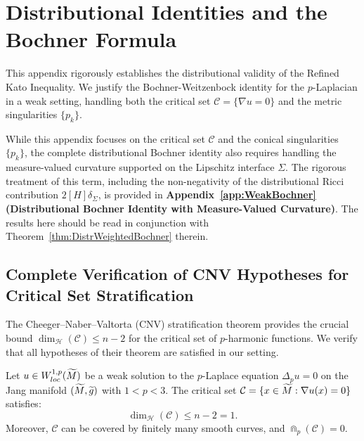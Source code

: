 \section{Distributional Identities and the Bochner Formula}
\label{app:Bochner}

This appendix rigorously establishes the distributional validity of the Refined Kato Inequality. We justify the Bochner-Weitzenbock identity for the $p$-Laplacian in a weak setting, handling both the critical set $\mathcal{C} = \{ \nabla u = 0 \}$ and the metric singularities $\{p_k\}$.

\begin{remark}
While this appendix focuses on the critical set $\mathcal{C}$ and the conical singularities $\{p_k\}$, the complete distributional Bochner identity also requires handling the measure-valued curvature supported on the Lipschitz interface $\Sigma$. The rigorous treatment of this term, including the non-negativity of the distributional Ricci contribution $2[H]\delta_\Sigma$, is provided in \textbf{Appendix~\ref{app:WeakBochner} (Distributional Bochner Identity with Measure-Valued Curvature)}. The results here should be read in conjunction with Theorem~\ref{thm:DistrWeightedBochner} therein.
\end{remark}

\subsection{Complete Verification of CNV Hypotheses for Critical Set Stratification}

The Cheeger--Naber--Valtorta (CNV) stratification theorem \cite{cheegernabervaltorta2015} provides the crucial bound $\dim_{\mathcal{H}}(\mathcal{C}) \le n-2$ for the critical set of $p$-harmonic functions. We verify that all hypotheses of their theorem are satisfied in our setting.

\begin{theorem}\label{thm:CNVComplete}
Let $u \in W^{1,p}_{loc}(\widetilde{M})$ be a weak solution to the $p$-Laplace equation $\Delta_p u = 0$ on the Jang manifold $(\widetilde{M}, \widetilde{g})$ with $1 < p < 3$. The critical set $\mathcal{C} = \{x \in \widetilde{M} : \nabla u(x) = 0\}$ satisfies:
\begin{equation}
    \dim_{\mathcal{H}}(\mathcal{C}) \le n - 2 = 1.
\end{equation}
Moreover, $\mathcal{C}$ can be covered by finitely many smooth curves, and $\Cap_p(\mathcal{C}) = 0$.
\end{theorem}

